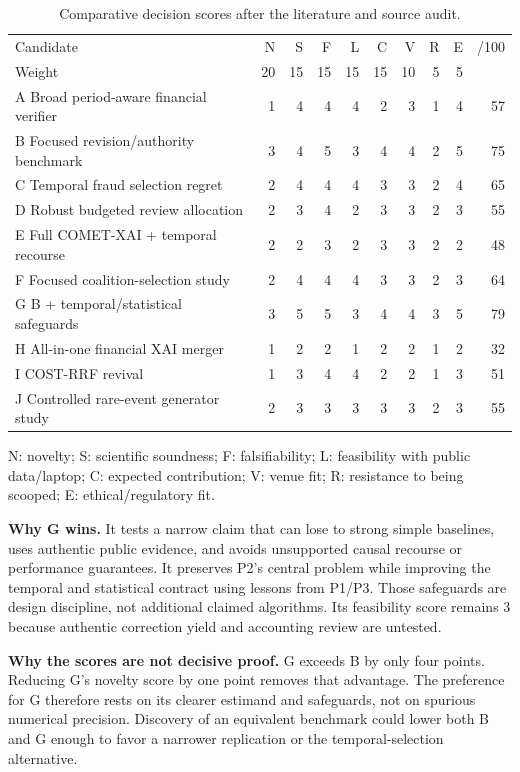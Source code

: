 \documentclass[11pt,a4paper]{article}
\newcommand{\lead}[1]{\textbf{\color{navy}#1}}
\begin{document}
\begin{table}[H]\caption{Comparative decision scores after the literature and source audit.}
\small\setlength{\tabcolsep}{3pt}
\begin{tabularx}{\linewidth}{Yrrrrrrrrr}\toprule
Candidate & N&S&F&L&C&V&R&E&/100\\
Weight &20&15&15&15&15&10&5&5&\\\midrule
A Broad period-aware financial verifier &1&4&4&4&2&3&1&4&57\\
B Focused revision/authority benchmark &3&4&5&3&4&4&2&5&75\\
C Temporal fraud selection regret &2&4&4&4&3&3&2&4&65\\
D Robust budgeted review allocation &2&3&4&2&3&3&2&3&55\\
E Full COMET-XAI + temporal recourse &2&2&3&2&3&3&2&2&48\\
F Focused coalition-selection study &2&4&4&4&3&3&2&3&64\\
G B + temporal/statistical safeguards &3&5&5&3&4&4&3&5&79\\
H All-in-one financial XAI merger &1&2&2&1&2&2&1&2&32\\
I COST-RRF revival &1&3&4&4&2&2&1&3&51\\
J Controlled rare-event generator study &2&3&3&3&3&3&2&3&55\\\bottomrule
\end{tabularx}
\smallskip\footnotesize N: novelty; S: scientific soundness; F: falsifiability; L: feasibility with public data/laptop; C: expected contribution; V: venue fit; R: resistance to being scooped; E: ethical/regulatory fit.\end{table}

\lead{Why G wins.} It tests a narrow claim that can lose to strong simple baselines, uses authentic public evidence, and avoids unsupported causal recourse or performance guarantees. It preserves P2's central problem while improving the temporal and statistical contract using lessons from P1/P3. Those safeguards are design discipline, not additional claimed algorithms. Its feasibility score remains 3 because authentic correction yield and accounting review are untested.

\lead{Why the scores are not decisive proof.} G exceeds B by only four points. Reducing G's novelty score by one point removes that advantage. The preference for G therefore rests on its clearer estimand and safeguards, not on spurious numerical precision. Discovery of an equivalent benchmark could lower both B and G enough to favor a narrower replication or the temporal-selection alternative.
\end{document}
